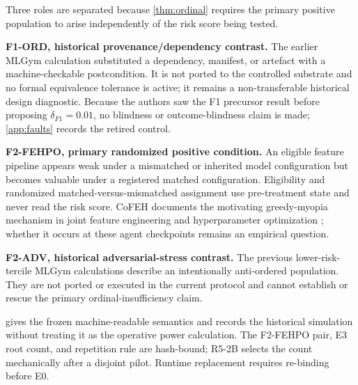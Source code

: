 Three roles are separated because \cref{thm:ordinal} requires the primary
positive population to arise independently of the risk score being tested.

\textbf{F1-ORD, historical provenance/dependency contrast.}  The earlier MLGym
calculation substituted a dependency, manifest, or artefact with a
machine-checkable postcondition.  It is not ported to the controlled substrate
and no formal equivalence tolerance is active; it remains a non-transferable
historical design diagnostic.  Because the authors saw the F1 precursor result
before proposing $\delta_{F1}=0.01$, no blindness or outcome-blindness claim is
made; \cref{app:faults} records the retired control.

\textbf{F2-FEHPO, primary randomized positive condition.}  An eligible feature
pipeline appears weak under a mismatched or inherited model configuration but
becomes valuable under a registered matched configuration.  Eligibility and
randomized matched-versus-mismatched assignment use pre-treatment state and
never read the risk score.  CoFEH documents the motivating greedy-myopia
mechanism in joint feature engineering and hyperparameter optimization
\citep{cofeh2026}; whether it occurs at these agent checkpoints remains an
empirical question.

\textbf{F2-ADV, historical adversarial-stress contrast.}  The previous
lower-risk-tercile MLGym calculations describe an intentionally anti-ordered
population.  They are not ported or executed in the current protocol and cannot
establish or rescue the primary ordinal-insufficiency claim.

 gives the frozen machine-readable semantics and records the
historical simulation without treating it as the operative power calculation.
The F2-FEHPO pair, E3 root count, and repetition rule are hash-bound; R5-2B
selects the count mechanically after a disjoint pilot.  Runtime replacement
requires re-binding before E0.
